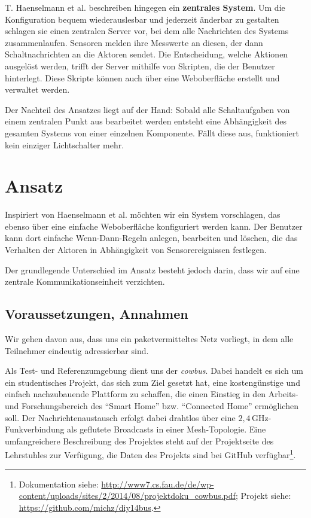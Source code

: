 \documentclass[conference]{IEEEtran}
\begin{document}
    T. Haenselmann et al. \cite{haenselmann2007skriptbasierte}
    beschreiben hingegen ein \textbf{zentrales System}.
    Um die Konfiguration bequem wiederauslesbar und jederzeit änderbar
    zu gestalten schlagen sie einen zentralen Server vor,
    bei dem alle Nachrichten des Systems zusammenlaufen.
    Sensoren melden ihre Messwerte an diesen, der dann Schaltnachrichten
    an die Aktoren sendet.
    Die Entscheidung, welche Aktionen ausgelöst werden, trifft der Server
    mithilfe von Skripten, die der Benutzer hinterlegt.
    Diese Skripte können auch über eine Weboberfläche erstellt und
    verwaltet werden.

    Der Nachteil des Ansatzes liegt auf der Hand:
    Sobald alle Schaltaufgaben von einem zentralen Punkt aus bearbeitet
    werden entsteht eine Abhängigkeit des gesamten Systems von einer
    einzelnen Komponente.
    Fällt diese aus, funktioniert kein einziger Lichtschalter mehr.


\section{Ansatz}
    Inspiriert von Haenselmann et al. \cite{haenselmann2007skriptbasierte}
    möchten wir ein System vorschlagen,
    das ebenso über eine einfache Weboberfläche konfiguriert werden kann.
    Der Benutzer kann dort einfache Wenn-Dann-Regeln anlegen, bearbeiten und
    löschen, die das Verhalten der Aktoren in Abhängigkeit von Sensorereignissen
    festlegen.

    Der grundlegende Unterschied im Ansatz besteht jedoch darin,
    dass wir auf eine zentrale Kommunikationseinheit verzichten.

    \subsection{Voraussetzungen, Annahmen}
        Wir gehen davon aus, dass uns ein paketvermitteltes Netz vorliegt,
        in dem alle Teilnehmer eindeutig adressierbar sind.

        Als Test- und Referenzumgebung dient uns der \emph{cowbus}.
        Dabei handelt es sich um ein studentisches Projekt,
        das sich zum Ziel gesetzt hat,
        eine kostengünstige und einfach nachzubauende Plattform zu schaffen,
        die einen Einstieg in den Arbeits- und Forschungsbereich des
        \enquote{Smart Home} bzw. \enquote{Connected Home} ermöglichen soll.
        Der Nachrichtenaustausch erfolgt dabei drahtlos über eine
        $2,4$\,GHz-Funkverbindung als geflutete Broadcasts in einer
        Mesh-Topologie.
        Eine umfangreichere Beschreibung des Projektes
        steht auf der Projektseite des Lehrstuhles zur Verfügung,
        die Daten des Projekts sind bei GitHub
        verfügbar\footnote{Dokumentation siehe: \url{http://www7.cs.fau.de/de/wp-content/uploads/sites/2/2014/08/projektdoku_cowbus.pdf}; Projekt siehe: \url{https://github.com/michz/diy14bus}.}.
\end{document}
